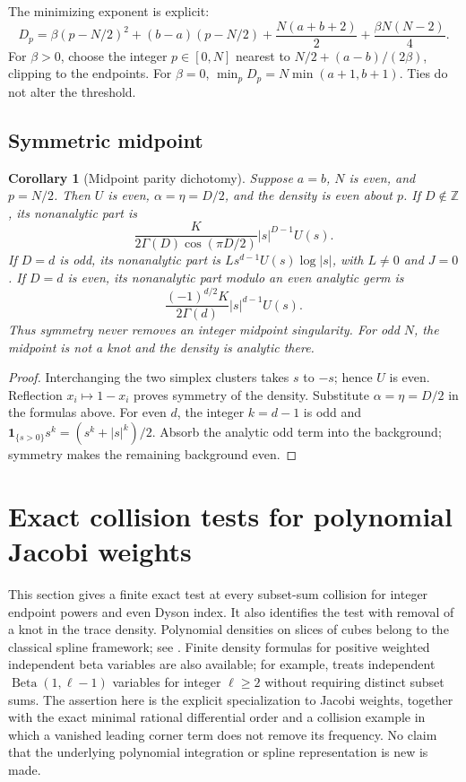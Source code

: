 \documentclass[11pt,a4paper]{article}
\newtheorem{corollary}[theorem]{Corollary}
\theoremstyle{definition}
\theoremstyle{remark}
\numberwithin{equation}{section}
\begin{document}
The minimizing exponent is explicit:
\[
 D_p=\beta(p-N/2)^2+(b-a)(p-N/2)
       +\frac{N(a+b+2)}2+\frac{\beta N(N-2)}4.
\]
For \(\beta>0\), choose the integer \(p\in[0,N]\) nearest to
\(N/2+(a-b)/(2\beta)\), clipping to the endpoints.
For \(\beta=0\), \(\min_pD_p=N\min(a+1,b+1)\).
Ties do not alter the threshold.

\subsection{Symmetric midpoint}

\begin{corollary}[Midpoint parity dichotomy]\label{p9:cor:JR:midpoint}
Suppose \(a=b\), \(N\) is even, and \(p=N/2\).
Then \(U\) is even, \(\alpha=\eta=D/2\), and the density is even
about \(p\). If \(D\notin\mathbb Z\), its nonanalytic part is
\[
 \frac{K}{2\Gamma(D)\cos(\pi D/2)}|s|^{D-1}U(s).
\]
If \(D=d\) is odd, its nonanalytic part is
\(Ls^{d-1}U(s)\log|s|\), with \(L\ne0\) and \(J=0\).
If \(D=d\) is even, its nonanalytic part modulo an even analytic germ is
\[
 \frac{(-1)^{d/2}K}{2\Gamma(d)}|s|^{d-1}U(s).
\]
Thus symmetry never removes an integer midpoint singularity.
For odd \(N\), the midpoint is not a knot and the density is analytic
there.
\end{corollary}

\begin{proof}
Interchanging the two simplex clusters takes \(s\) to \(-s\);
hence \(U\) is even. Reflection \(x_i\mapsto1-x_i\) proves symmetry
of the density. Substitute \(\alpha=\eta=D/2\) in the formulas above.
For even \(d\), the integer \(k=d-1\) is odd and
\(\mathbf1_{\{s>0\}}s^k=(s^k+|s|^k)/2\).
Absorb the analytic odd term into the background; symmetry makes the
remaining background even.
\end{proof}



\section{Exact collision tests for polynomial Jacobi weights}
\label{p9:sec:jc:collisions}

This section gives a finite exact test at every subset-sum collision for
integer endpoint powers and even Dyson index.  It also identifies the
test with removal of a knot in the trace density.  Polynomial densities
on slices of cubes belong to the classical spline framework; see
\cite{p9:JC_MarichalMossinghoff,p9:JC_Xu}.  Finite density formulas for
positive weighted independent beta variables are also available;
for example, \cite[Theorem~3.5]{p9:JC_LeePark} treats independent
$\operatorname{Beta}(1,\ell-1)$ variables for integer $\ell\ge2$
without requiring distinct subset sums.  The assertion here is the explicit
specialization to Jacobi weights, together with the exact minimal
rational differential order and a collision example in which a vanished
leading corner term does not remove its frequency.  No claim that the
underlying polynomial integration or spline representation is new is made.
\end{document}
